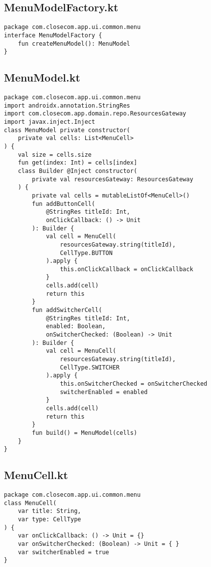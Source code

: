 \documentclass[listing]{espd}
\begin{document}
\subsection{MenuModelFactory.kt}
\begin{verbatim}
package com.closecom.app.ui.common.menu
interface MenuModelFactory {
    fun createMenuModel(): MenuModel
}
\end{verbatim}

\subsection{MenuModel.kt}
\begin{verbatim}
package com.closecom.app.ui.common.menu
import androidx.annotation.StringRes
import com.closecom.app.domain.repo.ResourcesGateway
import javax.inject.Inject
class MenuModel private constructor(
    private val cells: List<MenuCell>
) {
    val size = cells.size
    fun get(index: Int) = cells[index]
    class Builder @Inject constructor(
        private val resourcesGateway: ResourcesGateway
    ) {
        private val cells = mutableListOf<MenuCell>()
        fun addButtonCell(
            @StringRes titleId: Int,
            onClickCallback: () -> Unit
        ): Builder {
            val cell = MenuCell(
                resourcesGateway.string(titleId),
                CellType.BUTTON
            ).apply {
                this.onClickCallback = onClickCallback
            }
            cells.add(cell)
            return this
        }
        fun addSwitcherCell(
            @StringRes titleId: Int,
            enabled: Boolean,
            onSwitcherChecked: (Boolean) -> Unit
        ): Builder {
            val cell = MenuCell(
                resourcesGateway.string(titleId),
                CellType.SWITCHER
            ).apply {
                this.onSwitcherChecked = onSwitcherChecked
                switcherEnabled = enabled
            }
            cells.add(cell)
            return this
        }
        fun build() = MenuModel(cells)
    }
}
\end{verbatim}

\subsection{MenuCell.kt}
\begin{verbatim}
package com.closecom.app.ui.common.menu
class MenuCell(
    var title: String,
    var type: CellType
) {
    var onClickCallback: () -> Unit = {}
    var onSwitcherChecked: (Boolean) -> Unit = { }
    var switcherEnabled = true
}
\end{verbatim}
\end{document}
